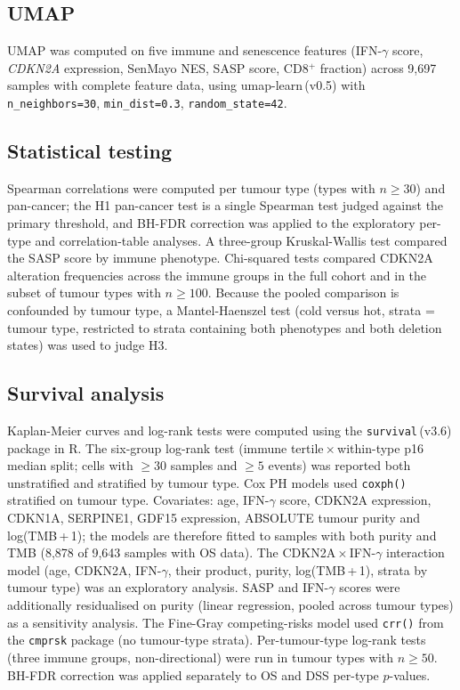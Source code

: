 \documentclass[10pt,twocolumn]{article}
\begin{document}
\subsection{UMAP}
UMAP was computed on five immune and senescence features (IFN-$\gamma$
score, \textit{CDKN2A} expression, SenMayo NES, SASP score, CD8$^+$
fraction) across 9,697 samples with complete feature data, using
umap-learn\,(v0.5) with \texttt{n\_neighbors=30}, \texttt{min\_dist=0.3},
\texttt{random\_state=42}.

\subsection{Statistical testing}
Spearman correlations were computed per tumour type (types with
$n\geq30$) and pan-cancer; the H1 pan-cancer test is a single Spearman
test judged against the primary threshold, and BH-FDR correction was
applied to the exploratory per-type and correlation-table analyses. A
three-group Kruskal-Wallis test compared the SASP score by immune
phenotype. Chi-squared tests compared CDKN2A alteration frequencies
across the immune groups in the full cohort and in the subset of tumour
types with $n\geq100$. Because the pooled comparison is confounded by
tumour type, a Mantel-Haenszel test (cold versus hot, strata = tumour
type, restricted to strata containing both phenotypes and both deletion
states) was used to judge H3.

\subsection{Survival analysis}
Kaplan-Meier curves and log-rank tests were computed using the
\texttt{survival}\,(v3.6) package in R. The six-group log-rank test
(immune tertile\,$\times$\,within-type p16 median split; cells with
$\geq30$ samples and $\geq5$ events) was reported both unstratified and
stratified by tumour type. Cox PH models used \texttt{coxph()}
stratified on tumour type. Covariates: age, IFN-$\gamma$ score, CDKN2A
expression, CDKN1A, SERPINE1, GDF15 expression, ABSOLUTE tumour purity
and log(TMB\,+\,1); the models are therefore fitted to samples with both
purity and TMB (8,878 of 9,643 samples with OS data). The
CDKN2A\,$\times$\,IFN-$\gamma$ interaction model (age, CDKN2A, IFN-$\gamma$,
their product, purity, log(TMB\,+\,1), strata by tumour type) was an
exploratory analysis. SASP and IFN-$\gamma$ scores were additionally
residualised on purity (linear regression, pooled across tumour types) as a
sensitivity analysis. The Fine-Gray competing-risks model used \texttt{crr()} from
the \texttt{cmprsk} package (no tumour-type strata). Per-tumour-type
log-rank tests (three immune groups, non-directional) were run in tumour
types with $n\geq50$. BH-FDR correction was applied separately to OS and DSS per-type
$p$-values.
\end{document}
